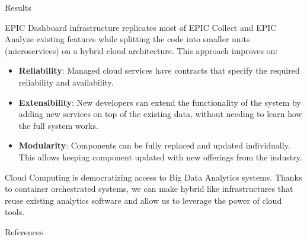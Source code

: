\documentclass[final]{beamer}
\newlength{\onecolwid}
\begin{document}
\begin{darkframes}
\begin{frame}
\begin{columns}[t]
\begin{column}{\onecolwid} %


\begin{exampleblock}{Results}

 EPIC Dashboard infrastructure replicates most of EPIC Collect and EPIC Analyze existing features while splitting the code into smaller units (microservices) on a hybrid cloud architecture. This approach improves on:
 
 \begin{itemize}
     \item \textbf{Reliability}: Managed cloud services have contracts that specify the required reliability and availability.
     \item \textbf{Extensibility}: New developers can extend the functionality of the system by adding new services on top of the existing data, without needing to learn how the full system works.
     \item \textbf{Modularity}: Components can be fully replaced and updated individually. This allows keeping component updated with new offerings from the industry.
 \end{itemize}


Cloud Computing is democratizing access to Big Data Analytics systems. Thanks to container orchestrated systems, we can make hybrid like infrastructures that reuse existing analytics software and allow us to leverage the power of cloud tools. 

\end{exampleblock}


\begin{exampleblock}{References}

\small{
\vspace{1cm}}
\end{exampleblock}



\end{column}
\end{columns}
\end{frame}
\end{darkframes}
\end{document}
